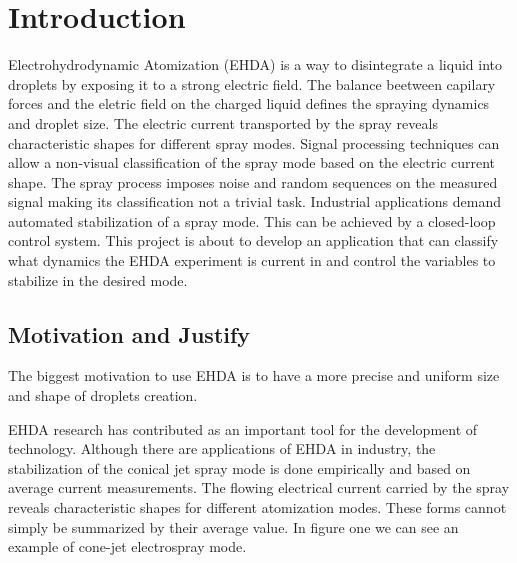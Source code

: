 \chapter{Introduction}
\label{chap:intro} 

Electrohydrodynamic Atomization (EHDA) is a way to disintegrate a liquid into droplets by exposing it to a strong electric field.\cite{prunet}
The balance beetween capilary forces and the eletric field on the charged liquid defines the spraying dynamics and droplet size.
The electric current transported by the spray reveals characteristic shapes for different spray modes.
Signal processing techniques can allow a non-visual classification of the spray mode based on the electric current shape.\cite{Sjaaks}
The spray process imposes noise and random sequences on the measured signal making its classification not a trivial task. 
Industrial applications demand automated stabilization of a spray mode. 
This can be achieved by a closed-loop control system. 
This project is about to develop an application that can classify what dynamics the EHDA experiment is current in and control the variables to stabilize in the desired mode. 


\section{Motivation and Justify}
\label{sec:motivacao}


The biggest motivation to use EHDA is to have a more precise and uniform size and shape of droplets creation.


EHDA research has contributed as an important tool for the development of technology. 
Although there are applications of EHDA in industry, the stabilization of the conical jet spray mode is done empirically and based on average current measurements.
The flowing electrical current carried by the spray reveals characteristic shapes for different atomization modes.
These forms cannot simply be summarized by their average value. In figure one we can see an example of cone-jet electrospray mode.

